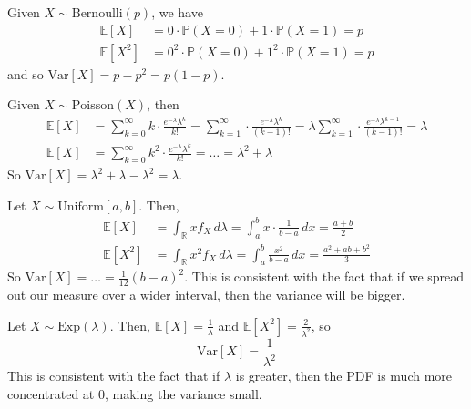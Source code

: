   \begin{example}[Bernoulli]
    Given $X \sim \mathrm{Bernoulli}(p)$, we have
    \begin{align*}
      \mathbb{E}[X] & = 0 \cdot \mathbb{P}(X = 0) + 1 \cdot \mathbb{P}(X = 1) = p \\
      \mathbb{E}[X^2] & =  0^2 \cdot \mathbb{P}(X = 0) + 1^2 \cdot \mathbb{P}(X = 1) = p
    \end{align*}
    and so $\mathrm{Var}[X] = p - p^2 = p(1 - p)$. 
  \end{example}

  \begin{example}[Poisson]
    Given $X \sim \mathrm{Poisson}(X)$, then 
    \begin{align*}
      \mathbb{E}[X] & = \sum_{k = 0}^\infty k \cdot \frac{e^{-\lambda} \lambda^k}{k!} = \sum_{k = 1}^\infty \cdot \frac{e^{-\lambda} \lambda^k}{(k-1)!} = \lambda \sum_{k = 1}^\infty \cdot \frac{e^{-\lambda} \lambda^{k-1}}{(k-1)!} = \lambda\\
      \mathbb{E}[X] & = \sum_{k=0}^\infty k^2 \cdot \frac{e^{-\lambda} \lambda^k}{k!} = \ldots = \lambda^2 + \lambda
    \end{align*}
    So $\mathrm{Var}[X] = \lambda^2 + \lambda - \lambda^2 = \lambda$. 
  \end{example}

  \begin{example}[Uniform]
    Let $X \sim \mathrm{Uniform}[a, b]$. Then, 
    \begin{align*}
      \mathbb{E}[X] & = \int_\mathbb{R} x f_X \, d\lambda = \int_a^b x \cdot \frac{1}{b - a}\,dx = \frac{a + b}{2} \\
      \mathbb{E}[X^2] & = \int_\mathbb{R} x^2 f_X \,d\lambda = \int_a^b \frac{x^2}{b - a} \,dx = \frac{a^2 + ab + b^2}{3} 
    \end{align*}
    So $\mathrm{Var}[X] = \ldots = \frac{1}{12} (b - a)^2$. This is consistent with the fact that if we spread out our measure over a wider interval, then the variance will be bigger. 
  \end{example}

  \begin{example}[Exponential]
    Let $X \sim \mathrm{Exp}(\lambda)$. Then, $\mathbb{E}[X] = \frac{1}{\lambda}$ and $\mathbb{E}[X^2] = \frac{2}{\lambda^2}$, so 
    \begin{equation}
      \mathrm{Var}[X] = \frac{1}{\lambda^2}
    \end{equation}
    This is consistent with the fact that if $\lambda$ is greater, then the PDF is much more concentrated at $0$, making the variance small. 
  \end{example}

